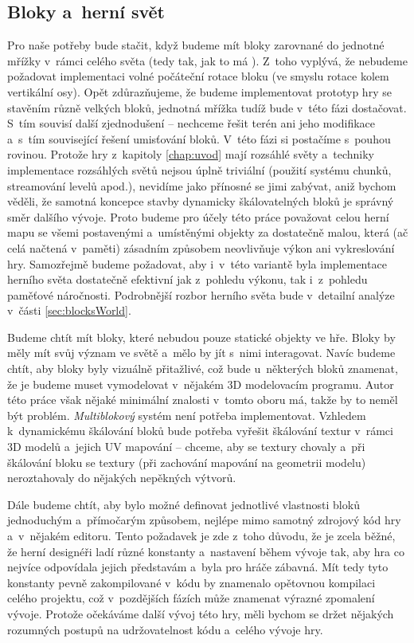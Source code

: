 
\subsection{Bloky a~herní svět}
\label{subsec:bloky}

Pro naše potřeby bude stačit, když budeme mít bloky zarovnané do jednotné mřížky v~rámci celého světa (tedy tak, jak to má \MC{}). Z~toho vyplývá, že nebudeme požadovat implementaci volné počáteční rotace bloku (ve smyslu rotace kolem vertikální osy). Opět zdůrazňujeme, že budeme implementovat prototyp hry se stavěním různě velkých bloků, jednotná mřížka tudíž bude v~této fázi dostačovat. S~tím souvisí další zjednodušení -- nechceme řešit terén ani jeho modifikace a~s~tím související řešení umisťování bloků. V~této fázi si postačíme s~pouhou rovinou. Protože hry z~kapitoly \ref{chap:uvod} mají rozsáhlé světy a~techniky implementace rozsáhlých světů nejsou úplně triviální (použití systému chunků, streamování levelů apod.), nevidíme jako přínosné se jimi zabývat, aniž bychom věděli, že samotná koncepce stavby dynamicky škálovatelných bloků je správný směr dalšího vývoje. Proto budeme pro účely této práce považovat celou herní mapu se všemi postavenými a~umístěnými objekty za dostatečně malou, která (ač celá načtená v~paměti) zásadním způsobem neovlivňuje výkon ani vykreslování hry. Samozřejmě budeme požadovat, aby i~v~této variantě byla implementace herního světa dostatečně efektivní jak z~pohledu výkonu, tak i~z~pohledu paměťové náročnosti. Podrobnější rozbor herního světa bude v~detailní analýze v~části \ref{sec:blocksWorld}.

Budeme chtít mít bloky, které nebudou pouze statické objekty ve hře. Bloky by měly mít svůj význam ve světě a~mělo by jít s~nimi interagovat. Navíc budeme chtít, aby bloky byly vizuálně přitažlivé, což bude u~některých bloků znamenat, že je budeme muset vymodelovat v~nějakém 3D modelovacím programu. Autor této práce však nějaké minimální znalosti v~tomto oboru má, takže by to neměl být problém. \textit{Multiblokový} systém není potřeba implementovat. Vzhledem k~dynamickému škálování bloků bude potřeba vyřešit škálování textur v~rámci 3D modelů a~jejich UV mapování -- chceme, aby se textury chovaly  a~při škálování bloku se textury (při zachování mapování na geometrii modelu) neroztahovaly do nějakých nepěkných výtvorů. 


Dále budeme chtít, aby bylo možné definovat jednotlivé vlastnosti bloků jednoduchým a~přímočarým způsobem, nejlépe mimo samotný zdrojový kód hry a~v~nějakém editoru. Tento požadavek je zde z~toho důvodu, že je zcela běžné, že herní designéři ladí různé konstanty a~nastavení během vývoje tak, aby hra co nejvíce odpovídala jejich představám a~byla pro hráče zábavná. Mít tedy tyto konstanty pevně zakompilované v~kódu by znamenalo opětovnou kompilaci celého projektu, což v~pozdějších fázích může znamenat výrazné zpomalení vývoje. Protože očekáváme další vývoj této hry, měli bychom se držet nějakých rozumných postupů na udržovatelnost kódu a~celého vývoje hry.

